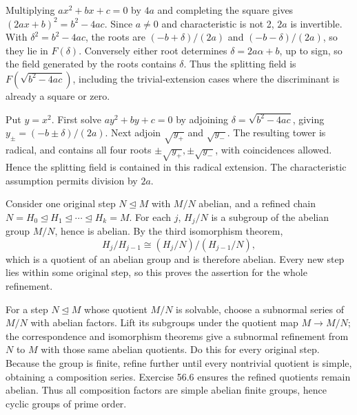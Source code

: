 Multiplying $ax^2+bx+c=0$ by $4a$ and completing the square gives $(2ax+b)^2=b^2-4ac$. Since $a\ne0$ and characteristic is not 2, $2a$ is invertible. With $\delta^2=b^2-4ac$, the roots are $(-b+\delta)/(2a)$ and $(-b-\delta)/(2a)$, so they lie in $F(\delta)$. Conversely either root determines $\delta=2a\alpha+b$, up to sign, so the field generated by the roots contains $\delta$. Thus the splitting field is $F(\sqrt{b^2-4ac})$, including the trivial-extension cases where the discriminant is already a square or zero.

Put $y=x^2$. First solve $ay^2+by+c=0$ by adjoining $\delta=\sqrt{b^2-4ac}$, giving $y_\pm=(-b\pm\delta)/(2a)$. Next adjoin $\sqrt{y_+}$ and $\sqrt{y_-}$. The resulting tower is radical, and contains all four roots $\pm\sqrt{y_+},\pm\sqrt{y_-}$, with coincidences allowed. Hence the splitting field is contained in this radical extension. The characteristic assumption permits division by $2a$.

Consider one original step $N\trianglelefteq M$ with $M/N$ abelian, and a refined chain $N=H_0\trianglelefteq H_1\trianglelefteq\cdots\trianglelefteq H_k=M$. For each $j$, $H_j/N$ is a subgroup of the abelian group $M/N$, hence is abelian. By the third isomorphism theorem,
\[H_j/H_{j-1}\cong(H_j/N)/(H_{j-1}/N),\]
which is a quotient of an abelian group and is therefore abelian. Every new step lies within some original step, so this proves the assertion for the whole refinement.

For a step $N\trianglelefteq M$ whose quotient $M/N$ is solvable, choose a subnormal series of $M/N$ with abelian factors. Lift its subgroups under the quotient map $M\to M/N$; the correspondence and isomorphism theorems give a subnormal refinement from $N$ to $M$ with those same abelian quotients. Do this for every original step. Because the group is finite, refine further until every nontrivial quotient is simple, obtaining a composition series. Exercise 56.6 ensures the refined quotients remain abelian. Thus all composition factors are simple abelian finite groups, hence cyclic groups of prime order.

